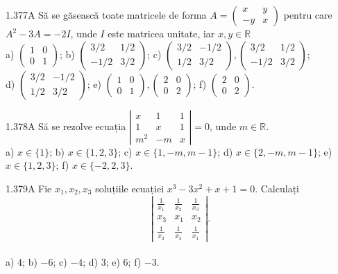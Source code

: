 \documentclass[11pt]{article}
\begin{document}
1.377A Să se găsească toate matricele de forma $A=\left(\begin{array}{cc}x & y \\ -y & x\end{array}\right)$ pentru care $A^{2}-3 A=-2 I$, unde $I$ este matricea unitate, iar $x, y \in \mathbb{R}$\\ a) $\left(\begin{array}{ll}1 & 0 \\ 0 & 1\end{array}\right)$; b) $\left(\begin{array}{cc}3 / 2 & 1 / 2 \\ -1 / 2 & 3 / 2\end{array}\right)$; c) $\left(\begin{array}{cc}3 / 2 & -1 / 2 \\ 1 / 2 & 3 / 2\end{array}\right),\left(\begin{array}{cc}3 / 2 & 1 / 2 \\ -1 / 2 & 3 / 2\end{array}\right)$;\\ d) $\left(\begin{array}{cc}3 / 2 & -1 / 2 \\ 1 / 2 & 3 / 2\end{array}\right)$; e) $\left(\begin{array}{ll}1 & 0 \\ 0 & 1\end{array}\right),\left(\begin{array}{ll}2 & 0 \\ 0 & 2\end{array}\right)$; f) $\left(\begin{array}{ll}2 & 0 \\ 0 & 2\end{array}\right)$.

1.378A Să se rezolve ecuația $\left|\begin{array}{ccc}x & 1 & 1 \\ 1 & x & 1 \\ m^{2} & -m & x\end{array}\right|=0$, unde $m \in \mathbb{R}$.\\ a) $x \in\{1\}$; b) $x \in\{1,2,3\}$; c) $x \in\{1,-m, m-1\}$; d) $x \in\{2,-m, m-1\}$; e) $x \in\{1,2,3\}$; f) $x \in\{-2,2,3\}$.

1.379A Fie $x_{1}, x_{2}, x_{3}$ soluțiile ecuației $x^{3}-3 x^{2}+x+1=0$. Calculați $$\left|\begin{array}{lll}\frac{1}{x_{1}} & \frac{1}{x_{2}} & \frac{1}{x_{3}} \\x_{3} & x_{1} & x_{2} \\\frac{1}{x_{2}} & \frac{1}{x_{3}} & \frac{1}{x_{1}}\end{array}\right|.$$\\ a) $4$; b) $-6$; c) $-4$; d) $3$; e) $6$; f) $-3$.
\end{document}
